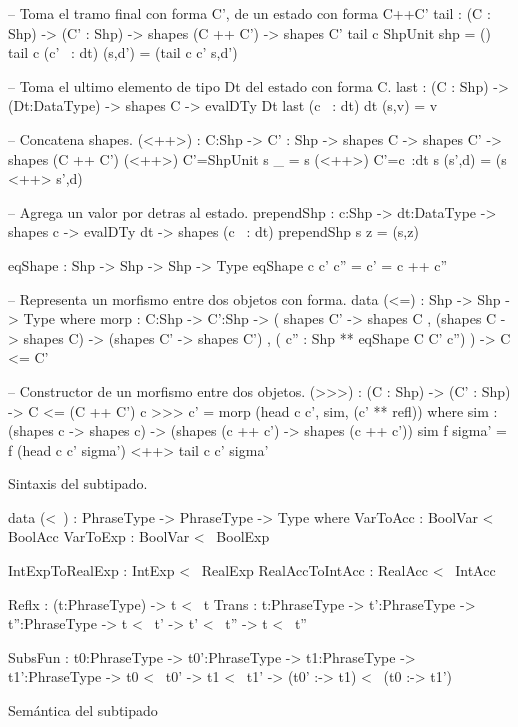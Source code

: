 \begin{code}
-- Toma el tramo final con forma C', de un estado con forma C++C'
tail : (C : Shp) -> (C' : Shp) -> shapes (C ++ C') -> shapes C'
tail c ShpUnit shp = ()
tail c (c' ~: dt) (s,d')  = (tail c c' s,d')

-- Toma el ultimo elemento de tipo Dt del estado con forma C.
last : (C : Shp) -> (Dt:DataType) -> shapes C -> evalDTy Dt
last (c ~: dt) dt (s,v) = v

-- Concatena shapes.
(<++>) : {C:Shp} -> {C' : Shp} -> shapes C -> shapes C' -> shapes (C ++ C')
(<++>) {C'=ShpUnit} s _ = s
(<++>) {C'=c~:dt} s (s',d) = (s <++> s',d)

-- Agrega un valor por detras al estado.
prependShp : {c:Shp} -> {dt:DataType} -> 
            shapes c -> evalDTy dt -> shapes (c ~: dt)
prependShp s z = (s,z)

eqShape : Shp -> Shp -> Shp -> Type
eqShape c c' c'' = c' = c ++ c''

-- Representa un morfismo entre dos objetos con forma.
data (<=) : Shp -> Shp -> Type where 
        morp : {C:Shp} -> {C':Shp} -> 
               ( shapes C' -> shapes C
               , (shapes C -> shapes C) -> (shapes C' -> shapes C')
               , ( c'' : Shp ** eqShape C C' c'')
               ) -> C <= C'

-- Constructor de un morfismo entre dos objetos.
(>>>) : (C : Shp) -> (C' : Shp) -> C <= (C ++ C')
c >>> c' = morp (head c c', sim, (c' ** refl))
    where
        sim : (shapes c -> shapes c) -> (shapes (c ++ c') -> shapes (c ++ c'))
        sim f sigma' = f (head c c' sigma') <++> tail c c' sigma'
\end{code}

\noindent Sintaxis del subtipado.
\begin{code}
data (<~) : PhraseType -> PhraseType -> Type where
    VarToAcc : BoolVar <~ BoolAcc
    VarToExp : BoolVar <~ BoolExp
    
    IntExpToRealExp : IntExp <~ RealExp
    RealAccToIntAcc : RealAcc <~ IntAcc
    
    Reflx : (t:PhraseType) -> t <~ t
    Trans : {t:PhraseType} -> {t':PhraseType} -> {t'':PhraseType} -> 
            t <~ t' -> t' <~ t'' -> t <~ t''
    
    SubsFun : {t0:PhraseType} -> {t0':PhraseType} -> 
              {t1:PhraseType} -> {t1':PhraseType} -> 
              t0 <~ t0' -> t1 <~ t1' -> (t0' :-> t1) <~ (t0 :-> t1')
\end{code}

\noindent Sem\'antica del subtipado

